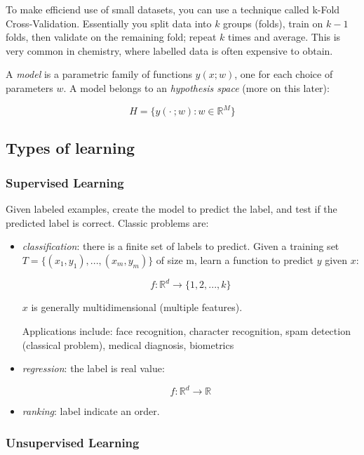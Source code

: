 \documentclass{article}
\begin{document}
To make efficiend use of small datasets, you can use a technique called
k-Fold Cross-Validation. Essentially you split data into \(k\) groups
(folds), train on \(k-1\) folds, then validate on the remaining fold;
repeat \(k\) times and average. This is very common in chemistry, where
labelled data is often expensive to obtain.

A \emph{model} is a parametric family of functions \(y(x;w)\), one for
each choice of parameters \(w\). A model belongs to an \emph{hypothesis
space} (more on this later):

\[H = \{ y(\cdot \ ; w): w \in \mathbb{R}^M \}\]

\subsection{Types of learning}\label{types-of-learning}

\subsubsection{Supervised Learning}\label{supervised-learning}

Given labeled examples, create the model to predict the label, and test
if the predicted label is correct. Classic problems are:

\begin{itemize}
\item
  \emph{classification}: there is a finite set of labels to predict.
  Given a training set \(T = \{(x_1,y_1),...,(x_m,y_m)\}\) of size m,
  learn a function to predict \(y\) given \(x\):

  \[f: \mathbb{R}^d \rightarrow \{1, 2, ..., k\}\]

  \(x\) is generally multidimensional (multiple features).

  Applications include: face recognition, character recognition, spam
  detection (classical problem), medical diagnosis, biometrics
\item
  \emph{regression}: the label is real value:

  \[f: \mathbb{R}^d \rightarrow \mathbb{R}\]
\item
  \emph{ranking}: label indicate an order.
\end{itemize}

\subsubsection{Unsupervised Learning}\label{unsupervised-learning}
\end{document}
